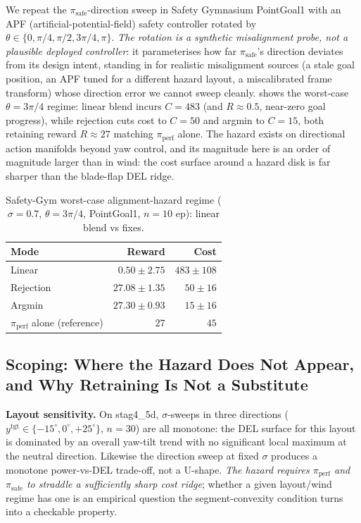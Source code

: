 \documentclass{article}
\begin{document}
We repeat the $\pi_{\mathrm{safe}}$-direction sweep in Safety Gymnasium PointGoal1 with an APF (artificial-potential-field) safety controller rotated by $\theta \in \{0, \pi/4, \pi/2, 3\pi/4, \pi\}$.
\emph{The rotation is a synthetic misalignment probe, not a plausible deployed controller}: it parameterises how far $\pi_{\mathrm{safe}}$'s direction deviates from its design intent, standing in for realistic misalignment sources (a stale goal position, an APF tuned for a different hazard layout, a miscalibrated frame transform) whose direction error we cannot sweep cleanly.
 shows the worst-case $\theta=3\pi/4$ regime: linear blend incurs $C=483$ (and $R\approx 0.5$, near-zero goal progress), while rejection cuts cost to $C=50$ and argmin to $C=15$, both retaining reward $R\approx 27$ matching $\pi_{\mathrm{perf}}$ alone.
The hazard exists on directional action manifolds beyond yaw control, and its magnitude here is an order of magnitude larger than in wind: the cost surface around a hazard disk is far sharper than the blade-flap DEL ridge.

\begin{table}[h]
\centering
\caption{Safety-Gym worst-case alignment-hazard regime ($\sigma=0.7$, $\theta=3\pi/4$, PointGoal1, $n=10$ ep): linear blend vs fixes.}
\label{tab:sg_hazard}
\small
\begin{tabular}{lrr}
\toprule
Mode & Reward & Cost \\
\midrule
Linear & $0.50 \pm 2.75$ & $483 \pm 108$ \\
Rejection & $27.08 \pm 1.35$ & $50 \pm 16$ \\
Argmin & $27.30 \pm 0.93$ & $15 \pm 16$ \\
$\pi_{\mathrm{perf}}$ alone (reference) & $27$ & $45$ \\
\bottomrule
\end{tabular}
\end{table}

\subsection{Scoping: Where the Hazard Does Not Appear, and Why Retraining Is Not a Substitute}
\label{sec:scoping}

\textbf{Layout sensitivity.}
On stag4\_5d, $\sigma$-sweeps in three directions ($y^{\mathrm{tgt}} \in \{-15^\circ, 0^\circ, +25^\circ\}$, $n=30$) are all monotone: the DEL surface for this layout is dominated by an overall yaw-tilt trend with no significant local maximum at the neutral direction.
Likewise the direction sweep at fixed $\sigma$ produces a monotone power-vs-DEL trade-off, not a U-shape.
\emph{The hazard requires $\pi_{\mathrm{perf}}$ and $\pi_{\mathrm{safe}}$ to straddle a sufficiently sharp cost ridge}; whether a given layout/wind regime has one is an empirical question the segment-convexity condition turns into a checkable property.
\end{document}
